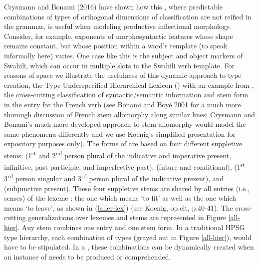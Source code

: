 \documentclass[output=paper]{langsci/langscibook}
\begin{document}
{Crysmann and Bonami (2016) have shown how this , where predictable combinations of types of orthogonal dimensions of classification are not reified in the grammar, is useful when modeling productive inflectional morphology. Consider, for example, exponents of morphosyntactic features whose shape remains constant, but whose position within a word's template (to speak informally here) varies. One case like this is the subject and object markers of Swahili, which can occur in multiple slots in the Swahili verb template. For reasons of space we illustrate the usefulness of this dynamic approach to type creation, the Type Underspecified Hierarchical Lexicon () with an example from \citet{Koenig99a}, the cross-cutting classification of syntactic/semantic information and stem form in the entry for the French verb  (see  Bonami and Boyé 2001 for a much more thorough discussion of French stem allomorphy along similar lines; Crysmann and Bonami's much more developed approach to stem allomorphy would model the same phenomena differently and we use Koenig's simplified presentation for expository purposes only). The forms of  are based on four different suppletive stems:  (1\textsuperscript{st} and 2\textsuperscript{nd} person plural of the indicative and imperative present, infinitive, past participle, and imperfective past),  (future and conditional),  (1\textsuperscript{st}-3\textsuperscript{rd} person singular and 3\textsuperscript{rd} person plural of the indicative present), and  (subjunctive present). These four suppletive stems are shared by all entries (i.e., senses) of the lexeme : the one which means `to fit' as well as the one which means `to leave', as shown in (\ref{aller-lex}) (see Koenig, op.cit, p.40-41). The cross-cutting generalizations over lexemes and stems are represented in Figure \ref{all-hier}. Any  stem combines one entry and one stem form. In a traditional HPSG type hierarchy, each combination of types (grayed out in Figure \ref{all-hier}), would have to be stipulated. In a , these combinations can be dynamically created when an instance of  needs to be produced or comprehended.

}
\end{document}
